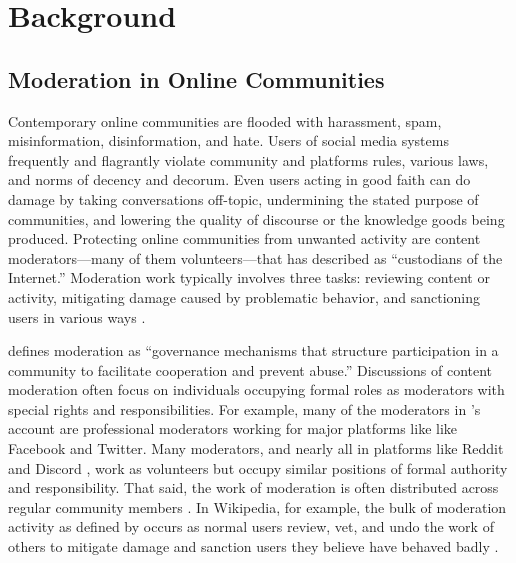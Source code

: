 \documentclass[format=acmsmall, natbib=true,  screen=true]{acmart}
\def\citepos#1{\citeauthor{#1}'s \cite{#1}}
\begin{document}
\section{Background}


\subsection{Moderation in Online Communities} 

Contemporary online communities are flooded with harassment, spam, misinformation, disinformation, and hate. Users of social media systems frequently and flagrantly violate community and platforms rules, various laws, and norms of decency and decorum. Even users acting in good faith can do damage by taking conversations off-topic, undermining the stated purpose of communities, and lowering the quality of discourse or the knowledge goods being produced. Protecting online communities from unwanted activity are content moderators---many of them volunteers---that \citet{gillespie_custodians_2018} has described as ``custodians of the Internet.''
Moderation work typically involves three tasks: reviewing content or activity, mitigating damage caused by problematic behavior, and sanctioning users in various ways \citep{gillespie_custodians_2018, seering_moderator_2019, jiang_moderation_2019, kiene_technological_2019}.

\citet{grimmelmann_virtues_2015} defines moderation as ``governance mechanisms that structure participation in a community to facilitate cooperation and prevent abuse.'' 
Discussions of content moderation often focus on individuals occupying formal roles as moderators with special rights and responsibilities. For example, many of the moderators in \citepos{gillespie_custodians_2018} account are professional moderators working for major platforms like like Facebook and Twitter. Many moderators, and nearly all in platforms like Reddit and Discord \citep{matias_going_2016, jiang_moderation_2019, kiene_technological_2019}, work as volunteers but occupy similar positions of formal authority and responsibility.
That said, the work of moderation is often distributed across regular community members \cite{lampe_slashdot_2004, kiene_surviving_2016}. In Wikipedia, for example, the bulk of moderation activity as defined by \citeauthor{grimmelmann_virtues_2015} occurs as normal users review, vet, and undo the work of others to mitigate damage and sanction users they believe have behaved badly \citep{piskorski_testing_2017}.
\end{document}
